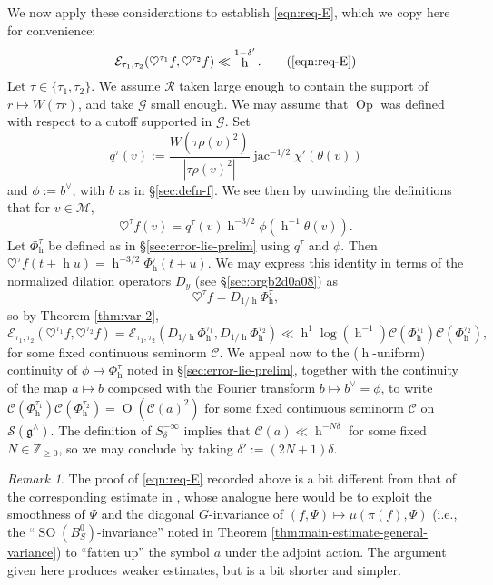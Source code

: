 \documentclass[reqno,10pt]{amsart}
\theoremstyle{plain} %
\theoremstyle{definition}
\theoremstyle{plain} %
\theoremstyle{remark}
\newtheorem*{remark*}            {Remark}
\theoremstyle{itplain} %
\theoremstyle{remark} %
\renewcommand{\geq}{\geqslant}
\numberwithin{equation}{section}
\DeclareMathOperator{\SO}{SO}
\def\O{\operatorname{O}}
\DeclareMathOperator{\Opp}{Op}
\DeclareMathOperator{\h}{h}
\DeclareMathOperator{\jac}{jac}
\begin{document}
We now apply these considerations to establish \eqref{eqn:req-E}, which we copy here for convenience:
\begin{equation}
  \mathcal{E}_{\tau_1,\tau_2}(
  \heartsuit^{\tau_1} f,
  \heartsuit^{\tau_2} f)
  \ll \h^{1-\delta'}.
  \tag{\ref{eqn:req-E}}
\end{equation}
Let $\tau \in \{\tau_1, \tau_2\}$.  We assume $\mathcal{R}$ taken large enough to contain the support of $r \mapsto W(\tau r)$, and take $\mathcal{G}$ small enough.  We may assume that $\Opp$ was defined with respect to a cutoff supported in $\mathcal{G}$.  Set
\[
  q^\tau(v) := \frac{W(\tau \rho(v)^2) }{ |\tau \rho(v)^2| } \jac^{-1/2} \chi'(\theta(v))
\]
and $\phi := b^\vee$, with $b$ as in \S\ref{sec:defn-f}.  We see then by unwinding the definitions that for $v \in \mathcal{M}$,
\[
  \heartsuit^{\tau} f(v) = q^\tau(v) \h^{-3/2} \phi(\h^{-1} \theta(v)).
\]
Let $\Phi_{\h}^\tau$ be defined as in \S\ref{sec:error-lie-prelim} using $q^\tau$ and $\phi$.  Then $\heartsuit^{\tau}f(t + \h u) = \h^{-3/2} \Phi_{\h}^\tau(t + u)$.  We may express this identity in terms of the normalized dilation operators $D_y$ (see \S\ref{sec:orgb2d0a08}) as
\[
  \heartsuit^{\tau} f = D_{1/\h} \Phi_{\h}^\tau,
\]
so by Theorem \ref{thm:var-2},
\[
  \mathcal{E}_{\tau_1,\tau_2}(\heartsuit^{\tau_1} f, \heartsuit^{\tau_2} f) = \mathcal{E}_{\tau_1,\tau_2} (D_{1/\h} \Phi_{\h}^{\tau_1}, D_{1/\h} \Phi_{\h}^{\tau_2}) \ll \h^{1} \log (\h^{-1}) \mathcal{C}(\Phi_{\h}^{\tau_1}) \mathcal{C}(\Phi_{\h}^{\tau_2}),
\]
for some fixed continuous seminorm $\mathcal{C}$.  We appeal now to the ($\h$-uniform) continuity of $\phi \mapsto \Phi_{\h}^{\tau}$ noted in \S\ref{sec:error-lie-prelim}, together with the continuity of the map $a \mapsto b$ composed with the Fourier transform $b \mapsto b^\vee = \phi$, to write $\mathcal{C}(\Phi_{\h}^{\tau_1}) \mathcal{C}(\Phi_{\h}^{\tau_2}) = \O(\mathcal{C}(a)^2)$ for some fixed continuous seminorm $\mathcal{C}$ on $\mathcal{S}(\mathfrak{g}^\wedge)$.  The definition of $S^{-\infty}_{\delta}$ implies that $\mathcal{C}(a) \ll \h^{- N \delta}$ for some fixed $N \in \mathbb{Z}_{\geq 0}$, so we may conclude by taking $\delta' := (2 N + 1) \delta$.

\begin{remark*}
  The proof of \eqref{eqn:req-E} recorded above is a bit different from that of the corresponding estimate in \cite{nelson-variance-II}, whose analogue here would be to exploit the smoothness of $\Psi$ and the diagonal $G$-invariance of $(f,\Psi) \mapsto \mu(\pi(f),\Psi)$ (i.e., the ``$\SO(B_S^0)$-invariance'' noted in Theorem \ref{thm:main-estimate-general-variance}) to ``fatten up'' the symbol $a$ under the adjoint action.  The argument given here produces weaker estimates, but is a bit shorter and simpler.
\end{remark*}
\end{document}
